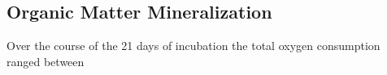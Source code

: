 \subsection{Organic Matter Mineralization}

Over the course of the 21 days of incubation the total oxygen consumption ranged between 